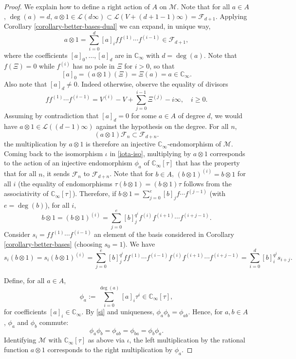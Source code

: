\documentclass[10pt,a4paper]{amsart}
\newcommand{\CC}{\mathbb{C}}
\begin{document}
\begin{proof}
We explain how to define a right action of $A$ on $\mathcal{M}$. Note that for all $a\in A$, $\deg(a)=d$,
$a\otimes1\in\mathcal{L}(d\infty)\subset\mathcal{L}(V+(d+1-1)\infty)=\mathcal{F}_{d+1}$.
Applying Corollary \ref{corollary-better-bases-dual} we can expand, in unique way,
\begin{equation}\label{decomposition-a}
a\otimes1=\sum_{i=0}^{d}[a]_iff^{(1)}\cdots f^{(i-1)}\in\mathcal{F}_{d+1},
\end{equation}
where the coefficients $[a]_0,\ldots,[a]_d$ are in $\CC_\infty$ with $d=\deg(a)$. Note that $f(\Xi)=0$ while $f^{(i)}$ has no pole in $\Xi$ for $i>0$, so that
$$[a]_0=(a\otimes1)(\Xi)=\Xi(a)=a\in\CC_\infty.$$ Also note that $[a]_d\neq0$. Indeed otherwise, observe the equality of divisors
\begin{equation}\label{interated-shtuka}
ff^{(1)}\cdots f^{(i-1)}=V^{(i)}-V+\sum_{j=0}^{i-1}\Xi^{(j)}-i\infty,\quad i\geq0.
\end{equation}
Assuming by contradiction that $[a]_d=0$ for some $a\in A$ of degree $d$, we would have $a\otimes1\in\mathcal{L}((d-1)\infty)$ against the hypothesis on the degree.
For all $n$,
$$(a\otimes1)\mathcal{F}_{n}\subset\mathcal{F}_{d+n}.$$ the multiplication by $a\otimes1$ is therefore an injective 
$\CC_\infty$-endomorphism of $\mathcal{M}$. Coming back to the isomorphism $\iota$ in \eqref{iota-iso}, multiplying by $a\otimes1$ corresponds to the action of an injective endomorphism $\phi_a$ of $\CC_\infty[\tau]$ that has the property that 
for all $n$, it sends $\mathcal{F}_n$ to $\mathcal{F}_{d+n}$. 
Note that for $b\in A$, $(b\otimes1)^{(i)}=b\otimes1$ for all $i$ (the equality of endomorphisms $\tau(b\otimes1)=(b\otimes1)\tau$ follows from the associativity of $\CC_\infty[\tau]$). Therefore, if $b\otimes1=\sum_{j=0}^e[b]_jf\cdots f^{(j-1)}$ (with $e=\deg(b)$), for all $i$,
$$b\otimes1=(b\otimes1)^{(i)}=\sum_{j=0}^{e}[b]_j^{q^i}f^{(i)}f^{(i+1)}\cdots f^{(i+j-1)}.$$ 
Consider $s_i=ff^{(1)}\cdots f^{(i-1)}$ an element of the basis considered in Corollary \ref{corollary-better-bases} (choosing $s_0=1$). 
We have 
\begin{equation}\label{si}
s_i(b\otimes1)=s_i(b\otimes1)^{(i)}=\sum_{j=0}^{e}[b]_j^{q^i}ff^{(1)}\cdots f^{(i-1)}f^{(i)}f^{(i+1)}\cdots f^{(i+j-1)}
=\sum_{i=0}^{d}[b]_i^{q^j}s_{i+j}.\end{equation}

Define, for all $a\in A$,
\begin{equation}\label{drinfeld-module}
\phi_a:=\sum_{i=0}^{\deg(a)}[a]_i\tau^i\in\CC_\infty[\tau],
\end{equation} for coefficients $[a]_i\in\CC_\infty$. By \eqref{si} and uniqueness,
$\phi_a\phi_b=\phi_{ab}$.
Hence, for $a,b\in A$, $\phi_a$ and $\phi_b$ commute: $$\phi_{a}\phi_b=\phi_{ab}=\phi_{ba}=\phi_b\phi_a.$$
Identifying $\mathcal{M}$ with $\CC_\infty[\tau]$ as above via $\iota$, the left multiplication by the rational function
$a\otimes1$ corresponds to the right multiplication by $\phi_a$. 
\end{proof}
\end{document}
